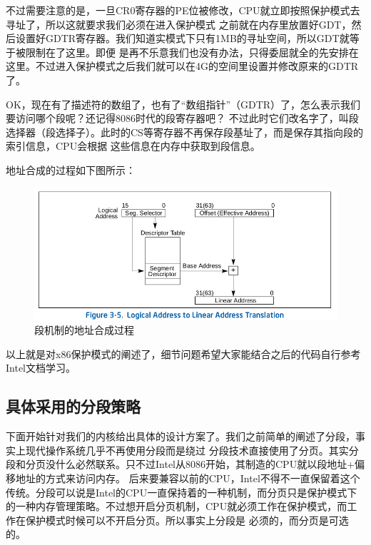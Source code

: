 \par 不过需要注意的是，一旦CR0寄存器的PE位被修改，CPU就立即按照保护模式去寻址了，所以这就要求我们必须在进入保护模式\allowbreak
之前就在内存里放置好GDT，然后设置好GDTR寄存器。我们知道实模式下只有1MB的寻址空间，所以GDT就等于被限制在了这里。即便\allowbreak
是再不乐意我们也没有办法，只得委屈就全的先安排在这里。不过进入保护模式之后我们就可以在4G的空间里设置并修改原来的GDTR了。

\par OK，现在有了描述符的数组了，也有了“数组指针”（GDTR）了，怎么表示我们要访问哪个段呢？还记得8086时代的段寄存器吧？\allowbreak
不过此时它们改名字了，叫段选择器（段选择子）。此时的CS等寄存器不再保存段基址了，而是保存其指向段的索引信息，CPU会根据\allowbreak
这些信息在内存中获取到段信息。

\par 地址合成的过程如下图所示：

\begin{figure}[H]
      \centering
      \includegraphics[scale=0.5]{picture/chapt6/protected_segment_addr.png}
      \caption{段机制的地址合成过程}
\end{figure}

\par 以上就是对x86保护模式的阐述了，细节问题希望大家能结合之后的代码自行参考Intel文档学习。

\subsection{具体采用的分段策略}

\par 下面开始针对我们的内核给出具体的设计方案了。我们之前简单的阐述了分段，事实上现代操作系统几乎不再使用分段而是绕过\allowbreak
分段技术直接使用了分页。其实分段和分页没什么必然联系。只不过Intel从8086开始，其制造的CPU就以段地址+偏移地址的方式来访问内存。\allowbreak
后来要兼容以前的CPU，Intel不得不一直保留着这个传统。分段可以说是Intel的CPU一直保持着的一种机制，而分页只是保护模式下\allowbreak
的一种内存管理策略。不过想开启分页机制，CPU就必须工作在保护模式，而工作在保护模式时候可以不开启分页。所以事实上分段是\allowbreak
必须的，而分页是可选的。

